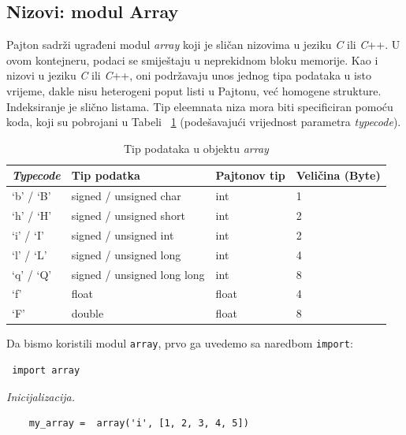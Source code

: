 \subsection{Nizovi: modul Array}

Pajton sadrži ugrađeni modul \textit{array} koji je sličan nizovima u jeziku  \textit{C} ili \textit{C}++. U ovom kontejneru, podaci se smiještaju u neprekidnom bloku memorije. Kao i nizovi u jeziku \textit{C} ili \textit{C}++, oni podržavaju unos jednog tipa podataka u isto vrijeme, dakle nisu heterogeni poput listi u Pajtonu, već homogene strukture. Indeksiranje je slično listama. Tip eleemnata niza mora biti specificiran pomoću koda, koji su pobrojani u Tabeli~ \ref{tab: Tip podataka u objektu array} (podešavajući vrijednost parametra \textit{typecode}). 

\begin{table}[!ht]
	\caption{ Tip podataka u objektu \textit{array}}\label{tab: Tip podataka u objektu array}
	\centering
	\begin{tabular}{llll}  \hline \hline
		\emph{Typecode}      & Tip podatka                  & Pajtonov tip & Veličina (Byte) \\ \hline \hline
		`b' / `B' & signed / unsigned char    & int   & 1 \\
		
		`h' / `H'  & signed / unsigned  short  & int   & 2 \\
        `i' / `I'  & signed / unsigned int     & int   & 2 \\
        `l' / `L'  &  signed / unsigned long   & int   & 4 \\
        `q' / `Q'  & signed / unsigned long long & int & 8 \\
        `f'        & float                       & float & 4 \\
         `F'       & double                      & float & 8 \\ \hline \hline
		
	\end{tabular} 

\end{table}

Da bismo koristili modul \texttt{array}, prvo ga uvedemo sa naredbom \texttt{import}: 
\begin{verbatim}
 import array 
\end{verbatim}

\textit{Inicijalizacija. } 
\begin{verbatim}
    my_array =  array('i', [1, 2, 3, 4, 5])
\end{verbatim}

